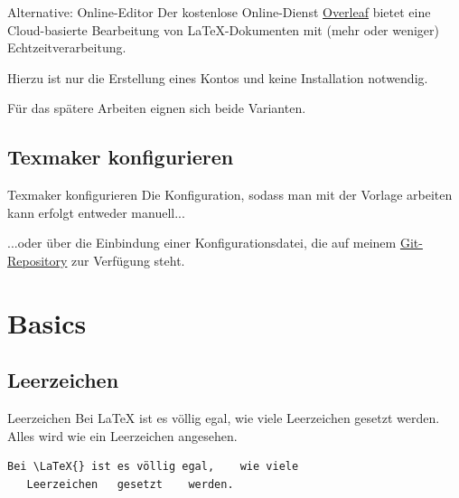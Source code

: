\documentclass[xcolor=dvipsnames]{beamer}
\begin{document}
\begin{frame}{Alternative: Online-Editor}
Der kostenlose Online-Dienst \href{https://de.overleaf.com/}{Overleaf} bietet eine Cloud-basierte Bearbeitung von \LaTeX{}-Dokumenten mit (mehr oder weniger) Echtzeitverarbeitung. \par\medskip
Hierzu ist nur die Erstellung eines Kontos und keine Installation notwendig. \par\medskip
Für das spätere Arbeiten eignen sich beide Varianten.
\end{frame}


\subsection{Texmaker konfigurieren}
\begin{frame}{Texmaker konfigurieren}
Die Konfiguration, sodass man mit der Vorlage arbeiten kann erfolgt entweder manuell... \par\medskip
...oder über die Einbindung einer Konfigurationsdatei, die auf meinem \href{https://github.com/SlendGamer/latex-tutorium.git}{Git-Repository} zur Verfügung steht.
\end{frame}


\section{Basics}
\subsection{Leerzeichen}
\begin{frame}[fragile]{Leerzeichen}
Bei \LaTeX{} ist es völlig egal, wie viele Leerzeichen gesetzt werden. Alles wird wie ein Leerzeichen angesehen. \par\medskip
\begin{lstlisting}
Bei \LaTeX{} ist es völlig egal,    wie viele
   Leerzeichen   gesetzt    werden.
\end{lstlisting}
\end{frame}
\end{document}
